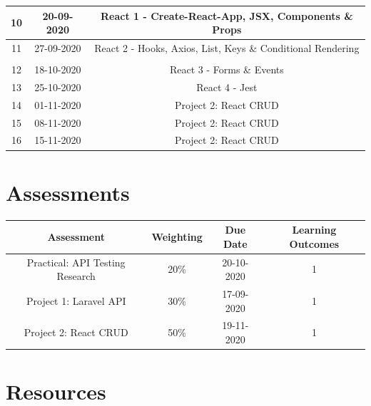 \documentclass{article}
\begin{document}
\begin{tabular}{|c|c|c|c|}
	\footnotesize 10      & \footnotesize 20-09-2020 & \multicolumn{2}{c|}{\footnotesize React 1 - Create-React-App, JSX, Components \& Props} \\ \hline
	\footnotesize 11     & \footnotesize 27-09-2020 & \multicolumn{2}{c|}{\footnotesize React 2 - Hooks, Axios, List, Keys \& Conditional Rendering} \\ \hline
	\rowcolor{yellow} \multicolumn{4}{|c|}{\footnotesize Mid Term Break}                    \\ \hline
	\footnotesize 12     & \footnotesize 18-10-2020 & \multicolumn{2}{c|}{\footnotesize React 3 - Forms \& Events}     \\ \hline
	\footnotesize 13     & \footnotesize 25-10-2020 & \multicolumn{2}{c|}{\footnotesize React 4 - Jest}    \\ \hline
	\footnotesize 14     & \footnotesize 01-11-2020 & \multicolumn{2}{c|}{\footnotesize Project 2: React CRUD}     \\ \hline
	\footnotesize 15     & \footnotesize 08-11-2020 & \multicolumn{2}{c|}{\footnotesize Project 2: React CRUD}     \\ \hline
	\footnotesize 16     & \footnotesize 15-11-2020 & \multicolumn{2}{c|}{\footnotesize Project 2: React CRUD}     \\ \hline
\end{tabular}

\section*{Assessments}
\renewcommand{\arraystretch}{1.5}
\begin{tabular}{|c|c|c|c|}
	\hline
	\textbf{Assessment}                                & \textbf{Weighting} & \textbf{Due Date} & \textbf{Learning Outcomes} \\ \hline 
	\small Practical: API Testing Research                      & \small 20\%        & \small 20-10-2020 & \small 1                   \\ \hline
	\small Project 1: Laravel API                       & \small 30\%        & \small 17-09-2020 & \small 1                   \\ \hline
	\small Project 2: React CRUD                       & \small 50\%        & \small 19-11-2020 & \small 1                   \\ \hline 
\end{tabular}

\section*{Resources}
\end{document}
